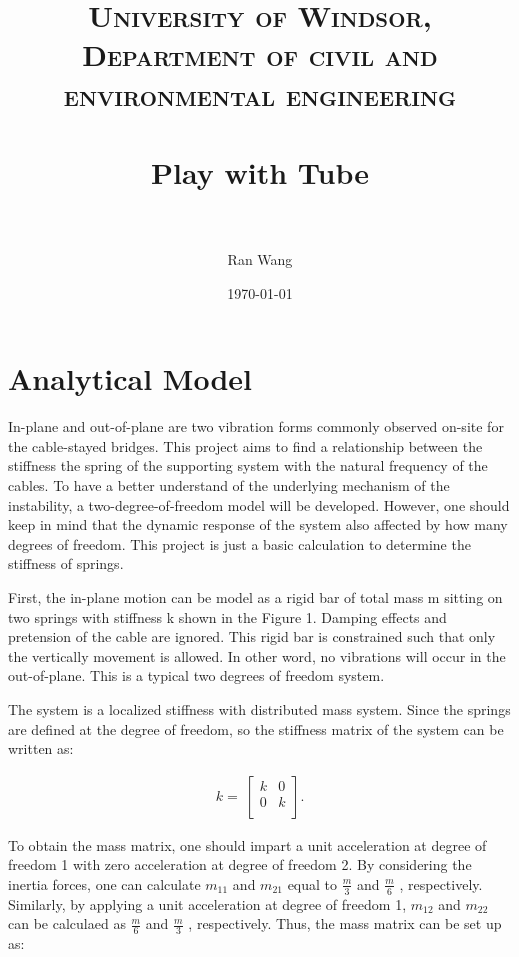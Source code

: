 \documentclass[paper=a4, fontsize=11pt]{scrartcl} %
\title{
\normalfont \normalsize
\textsc{University of Windsor, Department of civil and environmental engineering} \\ [25pt] %
\horrule{0.5pt} \\[0.4cm] %
\huge Play with Tube \\ %
\horrule{2pt} \\[0.5cm] %
}
\author{Ran Wang} %
\date{\normalsize\today} %
\numberwithin{equation}{section} %
\numberwithin{figure}{section} %
\numberwithin{table}{section} %
\begin{document}
\maketitle %


\section{Analytical Model}

In-plane and out-of-plane are two vibration forms commonly observed
on-site for the cable-stayed bridges. This project aims to find a
relationship between the stiffness the spring of the supporting system
with the natural frequency of the cables. To have a better understand
of the underlying mechanism of the instability, a
two-degree-of-freedom model will be developed. However, one should
keep in mind that the dynamic response of the system also affected by
how many degrees of freedom. This project is just a basic calculation
to determine the stiffness of springs.

First, the in-plane motion can be model as a rigid bar of total mass m
sitting on two springs with stiffness k shown in the Figure 1. Damping
effects and pretension of the cable are ignored. This rigid bar is
constrained such that only the vertically movement is allowed. In
other word, no vibrations will occur in the out-of-plane. This is a
typical two degrees of freedom system.

The system is a localized stiffness with distributed mass system.
Since the springs are defined at the degree of freedom, so the
stiffness matrix of the system can be written as:

\begin{align}
  k=\ \left[\begin{matrix}k&0\\0&k\\\end{matrix}\right].
\end{align}

To obtain the mass matrix, one should impart a unit acceleration at
degree of freedom 1 with zero acceleration at degree of freedom 2. By
considering the inertia forces, one can calculate $m_{11}$ and $m_{21}$
equal to $\frac{m}{3}$ and $\frac{m}{6}$ , respectively. Similarly, by
applying a unit acceleration at degree of freedom 1, $m_{12}$ and $m_{22}$
can be calculaed as $\frac{m}{6}$ and $\frac{m}{3}$ , respectively. Thus,
the mass matrix can be set up as:
\end{document}
